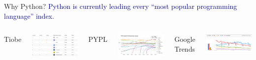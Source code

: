\documentclass[aspectratio=169]{beamer}
\begin{document}
\begin{frame}{Why Python?}
\large
\vspace{0.25 cm}
\textcolor{darkblue}{\mbox{\hspace{-0.5 cm}}Python is currently leading every ``most popular programming language'' index.}

\vspace{0.25 cm}
\begin{columns}[t]
\centering Tiobe

\vspace{0.1 cm}
\includegraphics[width=\linewidth]{python-rankings-tiobe-2022.png}

\centering PYPL

\vspace{0.1 cm}
\includegraphics[width=\linewidth]{python-rankings-pypl-2022.png}

\centering Google Trends

\vspace{0.1 cm}
\includegraphics[width=\linewidth]{python-rankings-googletrends-2022.png}
\end{columns}


\end{frame}
\end{document}

